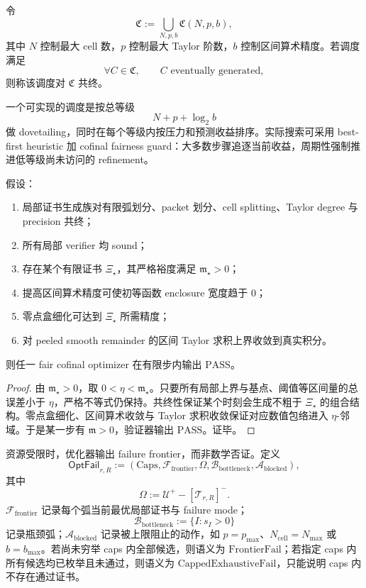 \begin{definition}[共终搜索族]\label{def:typed-address-biaxial-completion-cofinal-search-family}
令
\[
\mathfrak C
:=
\bigcup_{N,p,b}\mathfrak C(N,p,b),
\]
其中 \(N\) 控制最大 cell 数，\(p\) 控制最大 Taylor 阶数，\(b\) 控制区间算术精度。若调度满足
\[
\forall C\in\mathfrak C,\qquad C\text{ eventually generated},
\]
则称该调度对 \(\mathfrak C\) 共终。
\end{definition}

一个可实现的调度是按总等级
\[
N+p+\log_2 b
\]
做 dovetailing，同时在每个等级内按压力和预测收益排序。实际搜索可采用 best-first heuristic 加 cofinal fairness guard：大多数步骤追逐当前收益，周期性强制推进低等级尚未访问的 refinement。

\begin{theorem}[共终优化器的有限完备性]\label{thm:typed-address-biaxial-completion-cofinal-optimizer-completeness}
假设：
\begin{enumerate}
  \item 局部证书生成族对有限弧划分、packet 划分、cell splitting、Taylor degree 与 precision 共终；
  \item 所有局部 verifier 均 sound；
  \item 存在某个有限证书 \(\Xi_\star\)，其严格裕度满足 \(\mathfrak m_\star>0\)；
  \item 提高区间算术精度可使初等函数 enclosure 宽度趋于 \(0\)；
  \item 零点盒细化可达到 \(\Xi_\star\) 所需精度；
  \item 对 peeled smooth remainder 的区间 Taylor 求积上界收敛到真实积分。
\end{enumerate}
则任一 fair cofinal optimizer 在有限步内输出 \(\mathrm{PASS}\)。
\end{theorem}
\begin{proof}
由 \(\mathfrak m_\star>0\)，取 \(0<\eta<\mathfrak m_\star\)。只要所有局部上界与基点、阈值等区间量的总误差小于 \(\eta\)，严格不等式仍保持。共终性保证某个时刻会生成不粗于 \(\Xi_\star\) 的组合结构。零点盒细化、区间算术收敛与 Taylor 求积收敛保证对应数值包络进入 \(\eta\)-邻域。于是某一步有 \(\mathfrak m>0\)，验证器输出 \(\mathrm{PASS}\)。证毕。
\end{proof}

资源受限时，优化器输出 failure frontier，而非数学否证。定义
\[
\mathsf{OptFail}_{r,R}
:=
\left(
\mathrm{Caps},
\mathcal F_{\mathrm{frontier}},
\Omega,
\mathcal B_{\mathrm{bottleneck}},
\mathcal A_{\mathrm{blocked}}
\right),
\]
其中
\[
\Omega:=\mathcal U^+-\left[\mathcal T_{r,R}\right]^-.
\]
\(\mathcal F_{\mathrm{frontier}}\) 记录每个弧当前最优局部证书与 failure mode；
\[
\mathcal B_{\mathrm{bottleneck}}
:=
\{I:s_I>0\}
\]
记录瓶颈弧；\(\mathcal A_{\mathrm{blocked}}\) 记录被上限阻止的动作，如 \(p=p_{\max}\)、\(N_{\mathrm{cell}}=N_{\max}\) 或 \(b=b_{\max}\)。若尚未穷举 caps 内全部候选，则语义为 \(\mathrm{FrontierFail}\)；若指定 caps 内所有候选均已枚举且未通过，则语义为 \(\mathrm{CappedExhaustiveFail}\)，只能说明 caps 内不存在通过证书。

